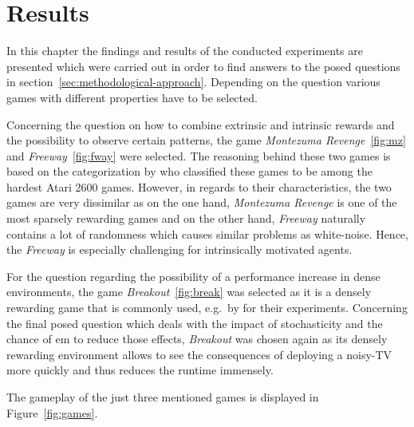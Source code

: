 \documentclass[draft,final]{vutinfth} %
\begin{document}
    \glsresetall


    \chapter{Results}\label{ch:results}

    In this chapter the findings and results of the conducted experiments are presented which were carried out in order to find answers to the posed questions in section~\ref{sec:methodological-approach}.
    Depending on the question various games with different properties have to be selected.

    Concerning the question on how to combine extrinsic and intrinsic rewards and the possibility to observe certain patterns, the game \textit{Montezuma Revenge}~\eqref{fig:mz} and \textit{Freeway}~\eqref{fig:fway} were selected.
    The reasoning behind these two games is based on the categorization by \citeauthor{bellemare_unifying_2016} who classified these games to be among the hardest Atari 2600 games.
    However, in regards to their characteristics, the two games are very dissimilar as on the one hand, \textit{Montezuma Revenge} is one of the most sparsely rewarding games and on the other hand, \textit{Freeway} naturally contains a lot of randomness which causes similar problems as white-noise.
    Hence, the \textit{Freeway} is especially challenging for intrinsically motivated agents.

    For the question regarding the possibility of a performance increase in dense environments, the game \textit{Breakout}~\eqref{fig:break} was selected as it is a densely rewarding game that is commonly used, e.g.\ by \citet{burda_large-scale_2018-1} for their experiments.
    Concerning the final posed question which deals with the impact of stochasticity and the chance of \gls{em} to reduce those effects, \textit{Breakout} was chosen again as its densely rewarding environment allows to see the consequences of deploying a noisy-TV more quickly and thus reduces the runtime immensely.

    The gameplay of the just three mentioned games is displayed in Figure~\ref{fig:games}.
\end{document}
